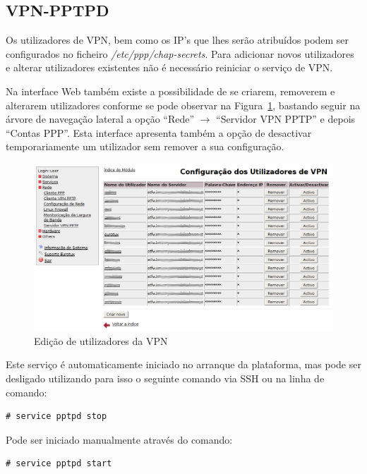 \subsection{VPN-PPTPD}

Os utilizadores de VPN, bem como os IP's que lhes serão atribuídos podem ser
configurados no ficheiro \emph{/etc/ppp/chap-secrets}.
Para adicionar novos utilizadores e alterar utilizadores existentes não é necessário
reiniciar o serviço de VPN.

Na interface Web também existe a possibilidade de se criarem, removerem e alterarem
utilizadores conforme se pode observar na Figura~\ref{fig:vpn}, bastando seguir na árvore de navegação lateral a opção ``Rede'' $\rightarrow$ ``Servidor VPN PPTP'' e depois ``Contas PPP''.
Esta interface apresenta também a opção de desactivar temporariamente um utilizador
sem remover a sua configuração.

\begin{figure}[H]
\begin{center}
\includegraphics[width=12cm]{include/img/vpn}
\end{center}
\caption{Edição de utilizadores da VPN}
\label{fig:vpn}
\end{figure}

Este serviço é automaticamente iniciado no arranque da plataforma, mas pode ser desligado utilizando para isso o seguinte comando via SSH ou na linha de comando:

\begin{verbatim}
# service pptpd stop
\end{verbatim}

Pode ser iniciado manualmente através do comando:

\begin{verbatim}
# service pptpd start
\end{verbatim}
